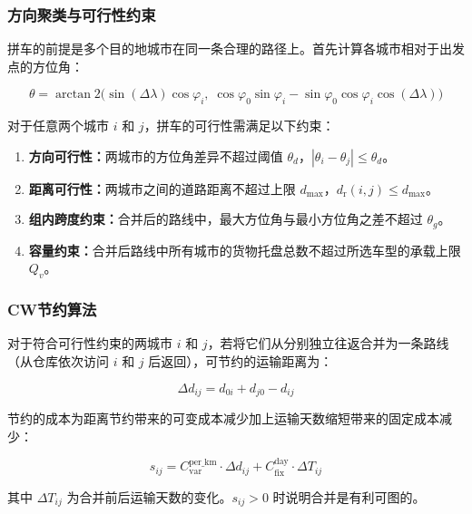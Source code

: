 \subsubsection{方向聚类与可行性约束}

拼车的前提是多个目的地城市在同一条合理的路径上。首先计算各城市相对于出发点的方位角\cite{bowditch2002navigator}：

\begin{equation}\label{eq:bearing}
\theta = \arctan\!2\Big(\sin(\Delta\lambda)\cos\varphi_i,\; \cos\varphi_0\sin\varphi_i - \sin\varphi_0\cos\varphi_i\cos(\Delta\lambda)\Big)
\end{equation}

对于任意两个城市 $i$ 和 $j$，拼车的可行性需满足以下约束：

\begin{enumerate}
    \item \textbf{方向可行性：}两城市的方位角差异不超过阈值 $\theta_d$，$|\theta_i - \theta_j| \leq \theta_d$。
    \item \textbf{距离可行性：}两城市之间的道路距离不超过上限 $d_{\max}$，$d_{\mathrm{r}}(i,j) \leq d_{\max}$。
    \item \textbf{组内跨度约束：}合并后的路线中，最大方位角与最小方位角之差不超过 $\theta_g$。
    \item \textbf{容量约束：}合并后路线中所有城市的货物托盘总数不超过所选车型的承载上限 $Q_v$。
\end{enumerate}

\subsubsection{CW节约算法}

对于符合可行性约束的两城市 $i$ 和 $j$，若将它们从分别独立往返合并为一条路线（从仓库依次访问 $i$ 和 $j$ 后返回），可节约的运输距离为：

\begin{equation}\label{eq:cw_saving_dist}
\Delta d_{ij} = d_{0i} + d_{j0} - d_{ij}
\end{equation}

节约的成本为距离节约带来的可变成本减少加上运输天数缩短带来的固定成本减少：

\begin{equation}\label{eq:cw_saving}
s_{ij} = C_{\mathrm{var}}^{\mathrm{per\_km}} \cdot \Delta d_{ij} + C_{\mathrm{fix}}^{\mathrm{day}} \cdot \Delta T_{ij}
\end{equation}

其中 $\Delta T_{ij}$ 为合并前后运输天数的变化。$s_{ij} > 0$ 时说明合并是有利可图的。

